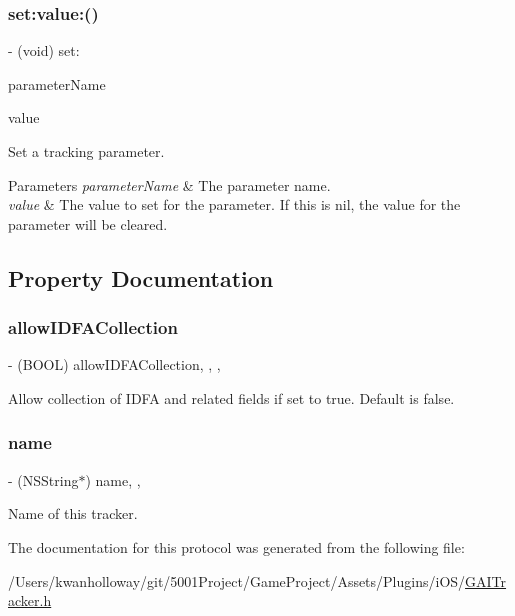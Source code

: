\subsubsection{\texorpdfstring{set\+:value\+:()}{set:value:()}}
{\footnotesize\ttfamily -\/ (void) set\+: \begin{DoxyParamCaption}\item[{(N\+S\+String $\ast$)}]{parameter\+Name }\item[{value:(N\+S\+String $\ast$)}]{value }\end{DoxyParamCaption}}

Set a tracking parameter.


\begin{DoxyParams}{Parameters}
{\em parameter\+Name} & The parameter name.\\
\hline
{\em value} & The value to set for the parameter. If this is nil, the value for the parameter will be cleared. \\
\hline
\end{DoxyParams}


\subsection{Property Documentation}
\mbox{\label{protocol_g_a_i_tracker-p_a0743d4e30b788e75ea3662b64f211153}} 
\subsubsection{\texorpdfstring{allow\+I\+D\+F\+A\+Collection}{allowIDFACollection}}
{\footnotesize\ttfamily -\/ (B\+O\+OL) allow\+I\+D\+F\+A\+Collection\hspace{0.3cm}{\ttfamily [read]}, {\ttfamily [write]}, {\ttfamily [nonatomic]}, {\ttfamily [assign]}}

Allow collection of I\+D\+FA and related fields if set to true. Default is false. \mbox{\label{protocol_g_a_i_tracker-p_a83fe089d882610176701a2f77e884d3c}} 
\subsubsection{\texorpdfstring{name}{name}}
{\footnotesize\ttfamily -\/ (N\+S\+String$\ast$) name\hspace{0.3cm}{\ttfamily [read]}, {\ttfamily [nonatomic]}, {\ttfamily [assign]}}

Name of this tracker. 

The documentation for this protocol was generated from the following file\+:\begin{DoxyCompactItemize}
\item 
/\+Users/kwanholloway/git/5001\+Project/\+Game\+Project/\+Assets/\+Plugins/i\+O\+S/\hyperlink{_g_a_i_tracker_8h}{G\+A\+I\+Tracker.\+h}\end{DoxyCompactItemize}
